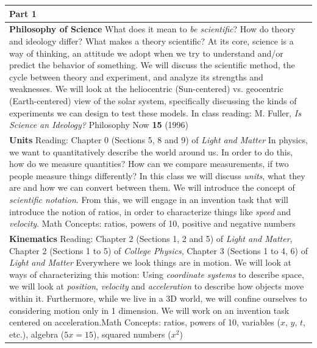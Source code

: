 \documentclass[12pt]{article}
\begin{document}
\noindent \begin{tabularx}{\textwidth}[c]{| X |}
	\hline
	{\textbf{\large Part 1}} \\ \hline
	\textbf{Philosophy of Science} \newline What does it mean to \textit{be scientific}? How do theory and ideology differ? What makes a theory scientific? At its core, science is a way of thinking, an attitude we adopt when we try to understand and/or predict the behavior of something. We will discuss the scientific method, the cycle between theory and experiment, and analyze its strengths and weaknesses. We will look at the heliocentric (Sun-centered) vs. geocentric (Earth-centered) view of the solar system, specifically discussing the kinds of experiments we can design to test these models. \newline In class reading: M. Fuller, \textit{Is Science an Ideology?} Philosophy Now \textbf{15} (1996)\\ \hline
	\textbf{Units} \newline Reading: Chapter 0 (Sections 5, 8 and 9) of \textit{Light and Matter} \newline In physics, we want to quantitatively describe the world around us. In order to do this, how do we measure quantities? How can we compare measurements, if two people measure things differently? In this class we will discuss \textit{units}, what they are and how we can convert between them. We will introduce the concept of \textit{scientific notation}. From this, we will engage in an invention task that will introduce the notion of ratios, in order to characterize things like \textit{speed} and \textit{velocity}. \newline Math Concepts: ratios, powers of 10, positive and negative numbers \\ \hline
	\textbf{Kinematics} \newline Reading: Chapter 2 (Sections 1, 2 and 5) of \textit{Light and Matter}, Chapter 2 (Sections 1 to 5) of \textit{College Physics}, Chapter 3 (Sections 1 to 4, 6) of \textit{Light and Matter} \newline Everywhere we look things are in motion. We will look at ways of characterizing this motion: Using \textit{coordinate systems} to describe space, we will look at \textit{position}, \textit{velocity} and \textit{acceleration} to describe how objects move within it. Furthermore, while we live in a 3D world, we will confine ourselves to considering motion only in 1 dimension. We will work on an invention task centered on acceleration.\newline Math Concepts: ratios, powers of 10, variables ($x$, $y$, $t$, etc.), algebra ($5x=15$), squared numbers ($x^2$)\\  \hline

\end{tabularx}
\end{document}

